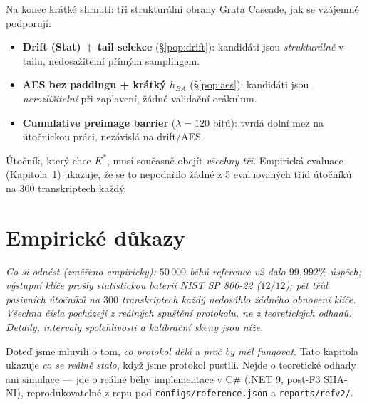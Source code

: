 \documentclass[11pt,a4paper]{article}
\begin{document}
Na konec krátké shrnutí: tři strukturální obrany Grata Cascade, jak se vzájemně podporují:

\begin{itemize}[leftmargin=*]
\item \textbf{Drift (Stat) + tail selekce} (§\ref{pop:drift}): kandidáti jsou \emph{strukturálně} v tailu, nedosažitelní přímým samplingem.
\item \textbf{AES bez paddingu + krátký $h_{BA}$} (§\ref{pop:aes}): kandidáti jsou \emph{nerozlišitelní} při zaplavení, žádné validační orákulum.
\item \textbf{Cumulative preimage barrier} ($\lambda = 120$ bitů): tvrdá dolní mez na útočnickou práci, nezávislá na drift/AES.
\end{itemize}

Útočník, který chce $K^*$, musí současně obejít \emph{všechny tři}. Empirická evaluace (Kapitola~\ref{pop:empirical}) ukazuje, že se to nepodařilo žádné z 5 evaluovaných tříd útočníků na 300 transkriptech každý.

\section{Empirické důkazy}\label{pop:empirical}

\noindent\textit{Co si odnést (změřeno empiricky): $50\,000$ běhů reference v2 dalo $99{,}992\%$ úspěch; výstupní klíče prošly statistickou baterií NIST SP 800-22 ($12/12$); pět tříd pasivních útočníků na $300$ transkriptech každý nedosáhlo žádného obnovení klíče. Všechna čísla pocházejí z reálných spuštění protokolu, ne z teoretických odhadů. Detaily, intervaly spolehlivosti a kalibrační skeny jsou níže.}

\medskip

Doteď jsme mluvili o tom, \emph{co protokol dělá} a \emph{proč by měl fungovat}. Tato kapitola ukazuje \emph{co se reálně stalo}, když jsme protokol pustili. Nejde o teoretické odhady ani simulace --- jde o reálné běhy implementace v C\# (.NET 9, post-F3 SHA-NI), reprodukovatelné z repu pod \texttt{configs/reference.json} a \texttt{reports/refv2/}.
\end{document}
